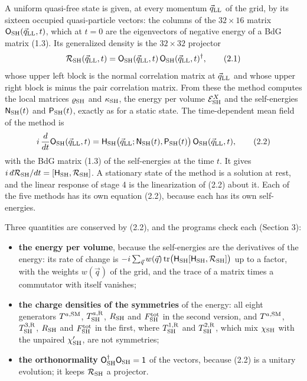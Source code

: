 \documentclass[
  10pt,
]{article}
\providecommand{\tightlist}{%
  \setlength{\itemsep}{0pt}\setlength{\parskip}{0pt}}
\begin{document}
A uniform quasi-free state is given, at every momentum
\(\vec q_{\rm LL}\) of the grid, by its sixteen occupied quasi-particle
vectors: the columns of the \(32\times16\) matrix
\(\mathsf O_{\rm SH}(\vec q_{\rm LL},t)\), which at \(t=0\) are the
eigenvectors of negative energy of a BdG matrix (1.3). Its generalized
density is the \(32\times32\) projector
\[\mathcal R_{\rm SH}(\vec q_{\rm LL},t)=\mathsf O_{\rm SH}(\vec q_{\rm LL},t)\,\mathsf O_{\rm SH}(\vec q_{\rm LL},t)^\dagger,\tag{2.1}\]
whose upper left block is the normal correlation matrix at
\(\vec q_{\rm LL}\) and whose upper right block is minus the pair
correlation matrix. From these the method computes the local matrices
\(\varrho_{\rm SH}\) and \(\kappa_{\rm SH}\), the energy per volume
\(\mathcal E^X_{\rm SH}\) and the self-energies
\(\mathsf N_{\rm SH}(t)\) and \(\mathsf P_{\rm SH}(t)\), exactly as for
a static state. The time-dependent mean field of the method is
\[i\,\frac{d}{dt}\mathsf O_{\rm SH}(\vec q_{\rm LL},t)=\mathsf H_{\rm SH}\big(\vec q_{\rm LL};\mathsf N_{\rm SH}(t),\mathsf P_{\rm SH}(t)\big)\,\mathsf O_{\rm SH}(\vec q_{\rm LL},t),\tag{2.2}\]
with the BdG matrix (1.3) of the self-energies at the time \(t\). It
gives
\(i\,d\mathcal R_{\rm SH}/dt=[\mathsf H_{\rm SH},\mathcal R_{\rm SH}]\).
A stationary state of the method is a solution at rest, and the linear
response of stage 4 is the linearization of (2.2) about it. Each of the
five methods has its own equation (2.2), because each has its own
self-energies.

Three quantities are conserved by (2.2), and the programs check each
(Section 3):

\begin{itemize}
\tightlist
\item
  \textbf{the energy per volume}, because the self-energies are the
  derivatives of the energy: its rate of change is
  \(-i\sum_{\vec q}w(\vec q)\,\mathrm{tr}\big(\mathsf H_{\rm SH}[\mathsf H_{\rm SH},\mathcal R_{\rm SH}]\big)\)
  up to a factor, with the weights \(w(\vec q)\) of the grid, and the
  trace of a matrix times a commutator with itself vanishes;
\item
  \textbf{the charge densities of the symmetries} of the energy: all
  eight generators \(T^{a,{\rm SM}}\), \(T^{a,{\rm R}}_{\rm SH}\),
  \(R_{\rm SH}\) and \(F^{\rm tot}_{\rm SH}\) in the second version, and
  \(T^{a,{\rm SM}}\), \(T^{3,{\rm R}}_{\rm SH}\), \(R_{\rm SH}\) and
  \(F^{\rm tot}_{\rm SH}\) in the first, where
  \(T^{1,{\rm R}}_{\rm SH}\) and \(T^{2,{\rm R}}_{\rm SH}\), which mix
  \(\chi_{\rm SH}\) with the unpaired \(\chi'_{\rm SH}\), are not
  symmetries;
\item
  \textbf{the orthonormality}
  \(\mathsf O_{\rm SH}^\dagger\mathsf O_{\rm SH}=\mathsf 1\) of the
  vectors, because (2.2) is a unitary evolution; it keeps
  \(\mathcal R_{\rm SH}\) a projector.
\end{itemize}
\end{document}
